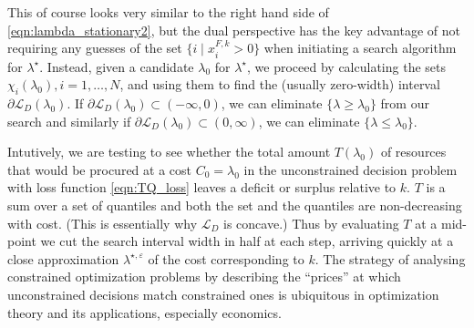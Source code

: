 \documentclass{article}
\begin{document}


This of course looks very similar to the right hand side of \eqref{eqn:lambda_stationary2}, but the dual perspective has the key advantage of not requiring any guesses of the set $\{i \mid x_i^{F,k} > 0\}$ when initiating a search algorithm for $\lambda^{\star}$.  Instead, given a candidate $\lambda_0$ for $\lambda^{\star}$, we proceed by calculating the sets $\chi_i(\lambda_0), i = 1,\ldots,N$, and using them to find the (usually zero-width) interval $\partial \mathcal{L}_D(\lambda_0)$. If $\partial \mathcal{L}_D(\lambda_0) \subset (-\infty,0)$, we can eliminate $\{\lambda \geq \lambda_0\}$ from our search and similarly if $\partial \mathcal{L}_D(\lambda_0) \subset (0, \infty)$, we can eliminate $\{\lambda \leq \lambda_0\}$. 

Intutively, we are testing to see whether the total amount $T(\lambda_0)$ of resources that would be procured at a cost $C_0=\lambda_0$ in the unconstrained decision problem with loss function \eqref{eqn:TQ_loss} leaves a deficit or surplus relative to $k$. $T$ is a sum over a set of quantiles and both the set and the quantiles are non-decreasing with cost. (This is essentially why $\mathcal{L}_D$ is concave.) Thus by evaluating $T$ at a mid-point we cut the search interval width in half at each step, arriving quickly at a close approximation $\lambda^{\star, \varepsilon}$ of the cost corresponding to $k$. The strategy of analysing constrained optimization problems by describing the ``prices'' at which unconstrained decisions match constrained ones is ubiquitous in optimization theory and its applications, especially economics.
\end{document}
